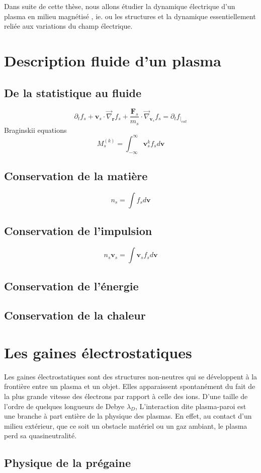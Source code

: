 Dans suite de cette thèse, nous allons étudier la dynamique électrique d'un
plasma en milieu magnétisé , ie. ou les structures et la dynamique
essentiellement reliée aux variations du champ électrique.
\section{Description fluide d'un plasma}

\subsection{De la statistique au fluide}
$$\partial_tf_s+\mathbf{v}_s\cdot\vec\nabla_\mathbf{r}f_s+
\frac{\mathbf{F}_s}{m_s}\cdot\vec\nabla_{\mathbf{v}_s}f_s
=\partial_tf_{|_{coll}}$$ 
Braginskii equations
$$M^{(k)}_s=\int_{-\infty}^{\infty}\mathbf{v}_s^kf_sd\mathbf{v}$$
\subsection{Conservation de la matière}
$$n_s=\int f_sd\mathbf{v}$$

\subsection{Conservation de l'impulsion}
$$n_s\mathbf{v}_s=\int \mathbf{v}_sf_sd\mathbf{v}$$
\subsection{Conservation de l'énergie}
\subsection{Conservation de la chaleur}
\section{Les gaines électrostatiques}
Les gaines électrostatiques sont des structures non-neutres qui se
développent à la frontière entre un plasma et un objet. Elles apparaissent
spontanément du fait de la plus grande vitesse des électrons par rapport à
celle des ions. D'une taille de l'ordre de quelques longueurs de Debye $\lambda_D$,
L'interaction dite plasma-paroi est une branche à part entière de la physique des plasmas.
En effet, au contact d'un milieu extérieur, que ce soit un obstacle matériel
ou un gaz ambiant, le plasma perd sa quasineutralité.
\subsection{Physique de la prégaine}
